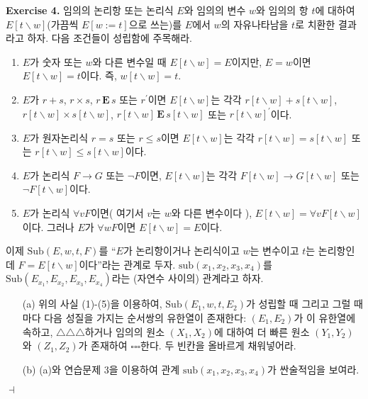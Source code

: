 \documentclass[12pt]{paper}
\newenvironment{context}[1][]
{ \noindent \textbf{{#1}.} }
{ \hfill $ \dashv $ }
\begin{document}
\begin{context}[Exercise 4]
임의의 논리항 또는 논리식 $E$와 임의의 변수 $w$와 임의의 항 $t$에 대하여
$E \left[ t \backslash w \right]$(가끔씩 $E \left[ w := t \right]$으로 쓰는)를 $E$에서
$w$의 자유나타남을 $t$로 치환한 결과라고 하자. 다음 조건들이 성립함에 주목해라.
\begin{enumerate}
\item $E$가 숫자 또는 $w$와 다른 변수일 때 $E \left[ t \backslash w \right] = E$이지만,
$E = w$이면 $E \left[ t \backslash w \right] = t$이다. 즉, $w \left[ t \backslash w \right] = t$.
\item $E$가 $r + s$, $r \times s$, $r \, \mathbf{E} \, s$ 또는 $r^{\prime}$이면
$E \left[ t \backslash w \right]$는 각각 $r \left[ t \backslash w \right] + s \left[ t \backslash w \right]$,
$r \left[ t \backslash w \right] \times s \left[ t \backslash w \right]$, $ r \left[ t \backslash w \right] \, \mathbf{E} \, s \left[ t \backslash w \right]$ 또는 $r \left[ t \backslash w \right]^{\prime}$이다.
\item $E$가 원자논리식 $r = s$ 또는 $r \le s$이면
$E \left[ t \backslash w \right]$는 각각 $ r \left[ t \backslash w \right] = s \left[ t \backslash w \right] $ 또는 $ r \left[ t \backslash w \right] \le s \left[ t \backslash w \right] $이다.
\item $E$가 논리식 $F \rightarrow G$ 또는 $\lnot F$이면,
$E \left[ t \backslash w \right]$는 각각
$F \left[ t \backslash w \right] \rightarrow G \left[ t \backslash w \right]$ 또는
$\lnot F \left[ t \backslash w \right]$이다.
\item $E$가 논리식 $\forall v F$이면( 여기서 $v$는 $w$와 다른 변수이다 ),
$E \left[ t \backslash w \right] = \forall v F \left[ t \backslash w \right]$이다.
그러나 $E$가 $\forall w F$이면 $E \left[ t \backslash w \right] = E$이다. 
\end{enumerate}
이제 $\mathrm{Sub} \left( E , w , t , F \right)$를 ``$E$가 논리항이거나 논리식이고 $w$는 변수이고 $t$는 논리항인데 $F = E\left[ t \backslash w \right]$이다''라는 관계로 두자.
$\mathrm{sub} \left( x_1, x_2, x_3, x_4 \right)$를 $\mathrm{Sub} \left( E_{x_1} , E_{x_2} , E_{x_3} , E_{x_4} \right)$라는 (자연수 사이의) 관계라고 하자.
\begin{itemize}
\item[(a)] 위의 사실 (1)-(5)을 이용하여, $\mathrm{Sub} \left( E_1, w, t, E_2 \right)$가 성립할 때 그리고 그럴 때마다
다음 성질을 가지는 순서쌍의 유한열이 존재한다:
$\left( E_1, E_2 \right)$가 이 유한열에 속하고,
$\triangle \triangle \triangle$하거나 임의의 원소 $\left( X_1, X_2 \right)$에 대하여
더 빠른 원소 $\left( Y_1 , Y_2 \right)$와 $\left( Z_1 , Z_2 \right)$가 존재하여 $\square \square \square$한다.
두 빈칸을 올바르게 채워넣어라.
\item[(b)] (a)와 연습문제 3을 이용하여 관계 $\mathrm{sub} \left( x_1 , x_2 , x_3 , x_4 \right)$가 싼술적임을 보여라.
\end{itemize}
\end{context}
\end{document}
